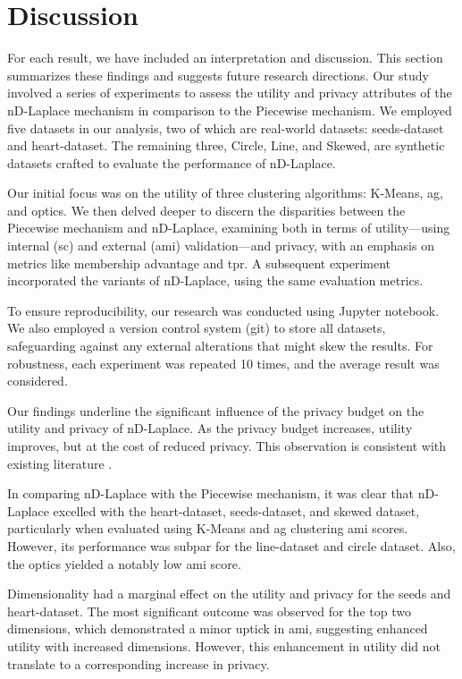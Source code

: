 \chapter{Discussion}
For each result, we have included an interpretation and discussion. This section summarizes these findings and suggests future research directions.
Our study involved a series of experiments to assess the utility and privacy attributes of the nD-Laplace mechanism in comparison to the Piecewise mechanism. We employed five datasets in our analysis, two of which are real-world datasets: seeds-dataset and heart-dataset. The remaining three, Circle, Line, and Skewed, are synthetic datasets crafted to evaluate the performance of nD-Laplace.

Our initial focus was on the utility of three clustering algorithms: K-Means, \gls{ag}, and \gls{optics}. We then delved deeper to discern the disparities between the Piecewise mechanism and nD-Laplace, examining both in terms of utility—using internal (\gls{sc}) and external (\gls{ami}) validation—and privacy, with an emphasis on metrics like membership advantage and \gls{tpr}. A subsequent experiment incorporated the variants of nD-Laplace, using the same evaluation metrics.

To ensure reproducibility, our research was conducted using Jupyter notebook. We also employed a version control system (git) to store all datasets, safeguarding against any external alterations that might skew the results. For robustness, each experiment was repeated 10 times, and the average result was considered. 

Our findings underline the significant influence of the privacy budget on the utility and privacy of nD-Laplace. As the privacy budget increases, utility improves, but at the cost of reduced privacy. This observation is consistent with existing literature \citep{sun_distributed_2019, xia_distributed_2020, 9679364}. \newline

In comparing nD-Laplace with the Piecewise mechanism, it was clear that nD-Laplace excelled with the heart-dataset, seeds-dataset, and skewed dataset, particularly when evaluated using K-Means and \gls{ag} clustering \gls{ami} scores. However, its performance was subpar for the line-dataset and circle dataset. Also, the \gls{optics} yielded a notably low \gls{ami} score.

Dimensionality had a marginal effect on the utility and privacy for the seeds and heart-dataset. The most significant outcome was observed for the top two dimensions, which demonstrated a minor uptick in \gls{ami}, suggesting enhanced utility with increased dimensions. However, this enhancement in utility did not translate to a corresponding increase in privacy. \newpage

